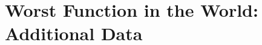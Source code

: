 \documentclass[10pt]{article} %
\numberwithin{equation}{section}
\theoremstyle{plain}
\theoremstyle{definition}
\newcommand{\<}{\langle}
\renewcommand{\>}{\rangle}
\renewcommand{\(}{\left(}
\renewcommand{\)}{\right)}
\renewcommand{\[}{\left[}
\renewcommand{\]}{\right]}
\begin{document}
\section{Worst Function in the World: Additional Data}
\end{document}
